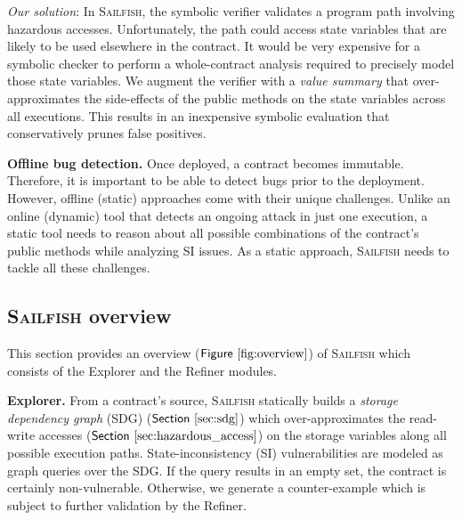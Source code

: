 \documentclass[conference, romanappendices]{tex/IEEEtran}
\theoremstyle{bfnote}
\newcommand{\toolname}{\textsc{Sailfish}\xspace}
\newcommand{\explorer}{{\sc Explorer}\xspace}
\newcommand{\refiner}{{\sc Refiner}\xspace}
\newcommand{\sdg}{storage dependency graph\xspace}
\newcommand{\Fig}[1]{\ensuremath{\sf Figure~\ref{#1}}}
\newcommand{\Sect}[1]{\ensuremath{\sf Section~\ref{#1}}}
\begin{document}
\textit{Our solution}:
In \toolname, the symbolic verifier validates a program path involving hazardous accesses.
Unfortunately, the path could access state variables that are likely to be used elsewhere in the contract.
It would be very expensive for a symbolic checker to perform a whole-contract analysis required to precisely model
those state variables.
We augment the verifier with a \textit{value summary} that over-approximates the side-effects of the public methods on the state variables across all executions.
This results in an inexpensive symbolic evaluation that conservatively prunes false positives.

\noindent
\textbf{Offline bug detection.}
Once deployed, a contract becomes immutable.
Therefore, it is important to be able to detect bugs prior to the deployment.
However, offline (static) approaches come with their unique challenges.
Unlike an online (dynamic) tool that detects an ongoing attack in just one execution, a static tool needs to reason about all possible combinations of the contract's public methods while analyzing SI issues.
As a static approach, \toolname{} needs to tackle all these challenges.

\subsection{\textbf{\toolname overview}}
This section provides an overview (\Fig{fig:overview}) of \toolname which consists of the \explorer and the \refiner modules.


\noindent
\textbf{Explorer.}
From a contract's source, \toolname{} statically builds a \textit{\sdg} ({SDG\EndAccSupp{}}) (\Sect{sec:sdg}) which over-approximates the read-write accesses (\Sect{sec:hazardous_access}) on the storage variables along all possible execution paths.
State-inconsistency (SI) vulnerabilities are modeled as graph queries over the SDG.
If the query results in an empty set, the contract is certainly non-vulnerable.
Otherwise, we generate a counter-example which is subject to further validation by the \refiner.
\end{document}
